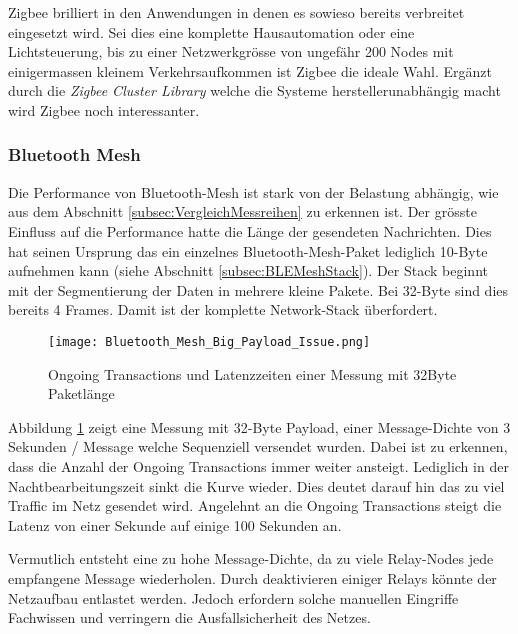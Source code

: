 Zigbee brilliert in den Anwendungen in denen es sowieso bereits verbreitet eingesetzt wird.
Sei dies eine komplette Hausautomation oder eine Lichtsteuerung, bis zu einer Netzwerkgrösse von ungefähr 200 Nodes mit einigermassen kleinem Verkehrsaufkommen ist Zigbee die ideale Wahl.
Ergänzt durch die \textit{Zigbee Cluster Library} welche die Systeme herstellerunabhängig macht wird Zigbee noch interessanter.


\subsubsection{Bluetooth Mesh}\label{subsubsec:FazitBluetoothMesh}
Die Performance von Bluetooth-Mesh ist stark von der Belastung abhängig, wie aus dem Abschnitt \ref{subsec:VergleichMessreihen} zu erkennen ist. Der grösste Einfluss auf die Performance hatte die Länge der gesendeten Nachrichten. Dies hat seinen Ursprung das ein einzelnes Bluetooth-Mesh-Paket lediglich 10-Byte aufnehmen kann (siehe Abschnitt \ref{subsec:BLEMeshStack}). Der Stack beginnt mit der Segmentierung der Daten in mehrere kleine Pakete. Bei 32-Byte sind dies bereits 4 Frames. Damit ist der komplette Network-Stack überfordert. 

\begin{figure}[H]
	\centering
	\texttt{[image: Bluetooth\_Mesh\_Big\_Payload\_Issue.png]}
	\caption{Ongoing Transactions und Latenzzeiten einer Messung mit 32Byte Paketlänge}\label{fig:Bluetooth_Mesh_Big_Payload_Issue}
\end{figure}

Abbildung \ref{fig:Bluetooth_Mesh_Big_Payload_Issue} zeigt eine Messung mit 32-Byte Payload, einer Message-Dichte von 3 Sekunden / Message welche Sequenziell versendet wurden. Dabei ist zu erkennen, dass die Anzahl der Ongoing Transactions immer weiter ansteigt. Lediglich in der Nachtbearbeitungszeit sinkt die Kurve wieder. Dies deutet darauf hin das zu viel Traffic im Netz gesendet wird. Angelehnt an die Ongoing Transactions steigt die Latenz von einer Sekunde auf einige 100 Sekunden an.

Vermutlich entsteht eine zu hohe Message-Dichte, da zu viele Relay-Nodes jede empfangene Message wiederholen. Durch deaktivieren einiger Relays könnte der Netzaufbau entlastet werden. Jedoch erfordern solche manuellen Eingriffe Fachwissen und verringern die Ausfallsicherheit des Netzes. 







